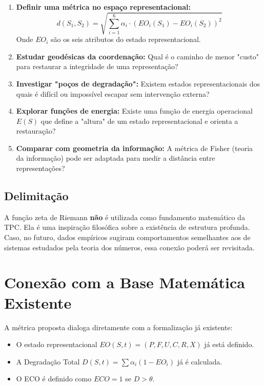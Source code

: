 \documentclass[12pt,a4paper]{article}
\begin{document}
\begin{enumerate}
    \item \textbf{Definir uma métrica no espaço representacional:}
    \[
    d(S_1, S_2) = \sqrt{\sum_{i=1}^{6} \alpha_i \cdot (EO_i(S_1) - EO_i(S_2))^2}
    \]
    Onde \( EO_i \) são os seis atributos do estado representacional.

    \item \textbf{Estudar geodésicas da coordenação:}
    Qual é o caminho de menor "custo" para restaurar a integridade de uma representação?

    \item \textbf{Investigar "poços de degradação":}
    Existem estados representacionais dos quais é difícil ou impossível escapar sem intervenção externa?

    \item \textbf{Explorar funções de energia:}
    Existe uma função de energia operacional \( E(S) \) que define a "altura" de um estado representacional e orienta a restauração?

    \item \textbf{Comparar com geometria da informação:}
    A métrica de Fisher (teoria da informação) pode ser adaptada para medir a distância entre representações?
\end{enumerate}

\subsection{Delimitação}

A função zeta de Riemann \textbf{não} é utilizada como fundamento matemático da TPC. Ela é uma inspiração filosófica sobre a existência de estrutura profunda. Caso, no futuro, dados empíricos sugiram comportamentos semelhantes aos de sistemas estudados pela teoria dos números, essa conexão poderá ser revisitada.

\section{Conexão com a Base Matemática Existente}

A métrica proposta dialoga diretamente com a formalização já existente:

\begin{itemize}
    \item O estado representacional \( EO(S,t) = (P, F, U, C, R, X) \) já está definido.
    \item A Degradação Total \( D(S,t) = \sum \alpha_i (1 - EO_i) \) já é calculada.
    \item O ECO é definido como \( ECO = 1 \) se \( D > \theta \).
\end{itemize}
\end{document}
